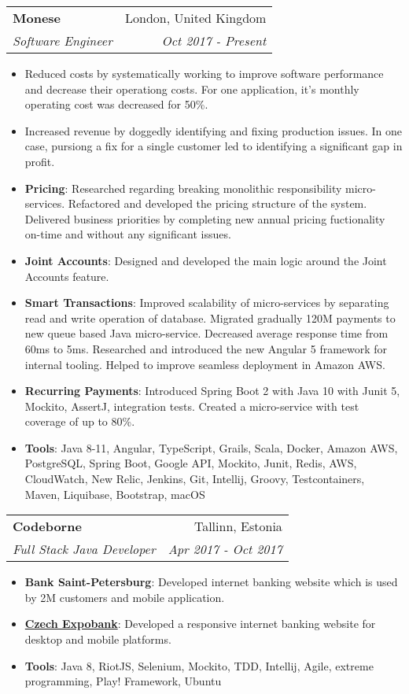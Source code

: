 \documentclass[letterpaper,11pt]{article}
\makeatletter
\newcommand{\resumeItem}[2]{
  \item\small{
    \textbf{#1}{: #2 \vspace{-2pt}}
  }
}
\newcommand{\resumeItemWithoutTitle}[2]{
  \item\small{
    \textbf{#1}{#2\vspace{-2pt}}
  }
}
\newcommand{\resumeSubheading}[4]{
  \vspace{-1pt}\item
    \begin{tabular*}{0.97\textwidth}[t]{l@{\extracolsep{\fill}}r}
      \textbf{#1} & #2 \\
      \textit{\small#3} & \textit{\small #4} \\
    \end{tabular*}\vspace{-5pt}
}
\newcommand{\resumeSubSubheading}[2]{
    \begin{tabular*}{0.97\textwidth}{l@{\extracolsep{\fill}}r}
      \textit{\small#1} & \textit{\small #2} \\
    \end{tabular*}\vspace{-5pt}
}
\newcommand{\resumeItemListStart}{\begin{itemize}}
\newcommand{\resumeItemListEnd}{\end{itemize}\vspace{-5pt}}
\makeatother
\begin{document}
    \resumeSubheading
      {Monese}{London, United Kingdom}
      {Software Engineer}{Oct 2017 - Present}
      \resumeItemListStart
        \resumeItemWithoutTitle{}
        {Reduced costs by systematically working to improve software performance and decrease their operationg costs. For one application, it's monthly operating cost was decreased for 50\%. }
        \resumeItemWithoutTitle{}
        {Increased revenue by doggedly identifying and fixing production issues. In one case, pursiong a fix for a single customer led to identifying a significant gap in profit.}
        \resumeItem{Pricing}
          {Researched regarding breaking monolithic responsibility micro-services. 
          Refactored and developed the pricing structure of the system. Delivered business priorities by completing new annual pricing fuctionality on-time and without any significant issues.}
        \resumeItem{Joint Accounts}
          {Designed and developed the main logic around the Joint Accounts feature.}
      \resumeItem{Smart Transactions}
        {Improved scalability of micro-services by separating read and write operation of database. Migrated gradually 120M payments to new queue based Java micro-service.
        Decreased average response time from 60ms to 5ms.
        Researched and introduced the new Angular 5 framework for internal tooling. 
        Helped to improve seamless deployment in Amazon AWS.}
      \resumeItem{Recurring Payments}
        {Introduced Spring Boot 2 with Java 10 with Junit 5, Mockito, AssertJ, integration tests.
        Created a micro-service with test coverage of up to 80\%.}
      \resumeItem{Tools}
        {Java 8-11, Angular, TypeScript, Grails, Scala, Docker, Amazon AWS, PostgreSQL, Spring Boot, Google API, Mockito, Junit, Redis, AWS, CloudWatch, New Relic, Jenkins, Git, Intellij, Groovy, Testcontainers, Maven, Liquibase, Bootstrap, macOS}
  \resumeItemListEnd

    \resumeSubheading
      {Codeborne}{Tallinn, Estonia}
      {Full Stack Java Developer}{Apr 2017 - Oct 2017}
      \resumeItemListStart
        \resumeItem{Bank Saint-Petersburg}
          {Developed internet banking website which is used by 2M customers and mobile application.}
        \resumeItem{\href{https://expobanking.cz/}{Czech Expobank}}
          {Developed a responsive internet banking website for desktop and mobile platforms.}
        \resumeItem{Tools}
        {Java 8, RiotJS, Selenium, Mockito, TDD, Intellij, Agile, extreme programming, Play! Framework, Ubuntu}
      \resumeItemListEnd
\end{document}

